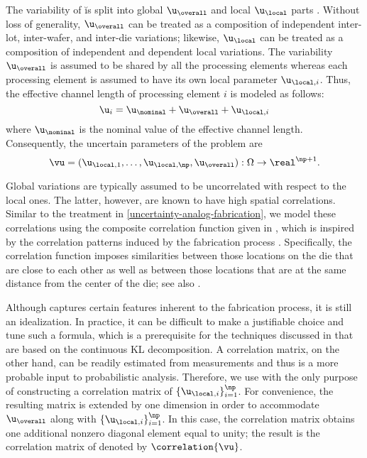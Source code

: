 The variability of \u is split into global $\u_\overall$ and local $\u_\local$
parts \cite{shen2009, chandra2010}. Without loss of generality, $\u_\overall$
can be treated as a composition of independent inter-lot, inter-wafer, and
inter-die variations; likewise, $\u_\local$ can be treated as a composition of
independent and dependent local variations. The variability $\u_\overall$ is
assumed to be shared by all the \np processing elements whereas each processing
element is assumed to have its own local parameter $\u_{\local, i}$. Thus, the
effective channel length of processing element $i$ is modeled as follows:
\[
  \u_i = \u_\nominal + \u_\overall + \u_{\local, i}
\]
where $\u_\nominal$ is the nominal value of the effective channel length.
Consequently, the uncertain parameters of the problem are
\[
  \vu = (\u_{\local, 1}, \dotsc, \u_{\local, \np}, \u_\overall): \Omega \to \real^{\np + 1}.
\]

Global variations are typically assumed to be uncorrelated with respect to the
local ones. The latter, however, are known to have high spatial correlations.
Similar to the treatment in \cref{uncertainty-analog-fabrication}, we model
these correlations using the composite correlation function given in
, which is inspired by the correlation patterns induced
by the fabrication process \cite{friedberg2005, chandrakasan2000, cheng2011}.
Specifically, the correlation function imposes similarities between those
locations on the die that are close to each other as well as between those
locations that are at the same distance from the center of the die; see also
\cite{ghanem1991, ghanta2006, bhardwaj2008, huang2009a, lee2013}.

Although  captures certain features inherent to the
fabrication process, it is still an idealization. In practice, it can be
difficult to make a justifiable choice and tune such a formula, which is a
prerequisite for the techniques discussed in  that are based
on the continuous \ac{KL} decomposition. A correlation matrix, on the other
hand, can be readily estimated from measurements and thus is a more probable
input to probabilistic analysis. Therefore, we use  with
the only purpose of constructing a correlation matrix of $\{ \u_{\local, i}
\}_{i = 1}^\np$. For convenience, the resulting matrix is extended by one
dimension in order to accommodate $\u_\overall$ along with $\{ \u_{\local, i}
\}_{i = 1}^\np$. In this case, the correlation matrix obtains one additional
nonzero diagonal element equal to unity; the result is the correlation matrix of
\vu denoted by $\correlation{\vu}$.

